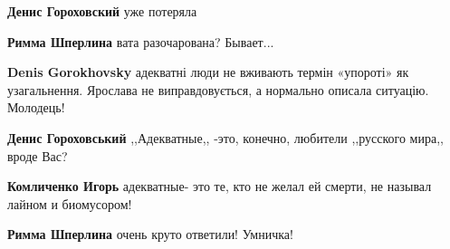 \begin{itemize}
\begin{itemize}
\textbf{Денис Гороховский} уже потеряла

\begin{itemize}
 
\textbf{Римма Шперлина} вата разочарована? Бывает...
\end{itemize}

 
\textbf{Denis Gorokhovsky} адекватні люди не вживають термін «упороті» як узагальнення. Ярослава не виправдовується, а нормально описала ситуацію. Молодець!

 
\textbf{Денис Гороховський} ,,Адекватные,, -это, конечно, любители ,,русского мира,, вроде Вас?

\begin{itemize}
 
\textbf{Комличенко Игорь} адекватные- это те, кто не желал ей смерти, не называл лайном и биомусором!

 
\textbf{Римма Шперлина} очень круто ответили! Умничка!

 

\end{itemize}
\end{itemize}
\end{itemize}
